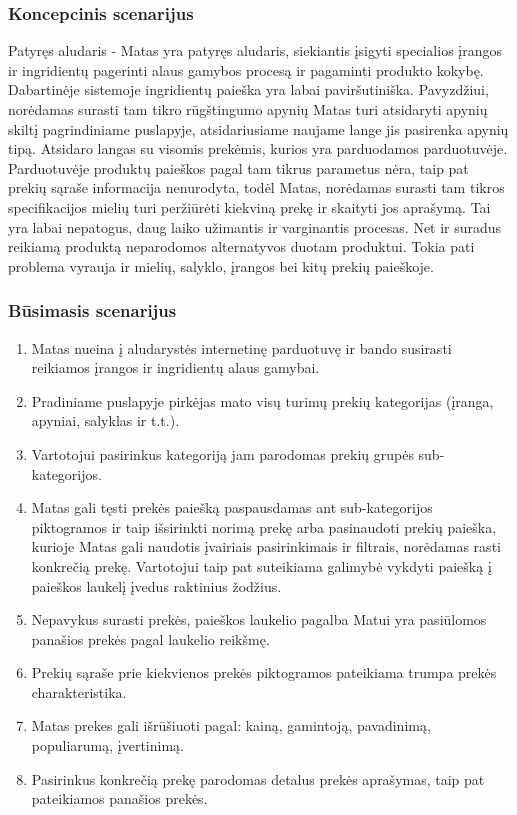 \documentclass[oneside]{VUMIFPSkursinis}
\begin{document}
		\subsubsection{Koncepcinis scenarijus}
			Patyręs aludaris - Matas yra patyręs aludaris, siekiantis įsigyti specialios įrangos ir ingridientų pagerinti alaus gamybos procesą ir pagaminti produkto kokybę.
			Dabartinėje sistemoje ingridientų paieška yra labai paviršutiniška.
			Pavyzdžiui, norėdamas surasti tam tikro rūgštingumo apynių Matas turi atsidaryti apynių skiltį pagrindiniame puslapyje, atsidariusiame naujame lange jis pasirenka apynių tipą.
			Atsidaro langas su visomis prekėmis, kurios yra parduodamos parduotuvėje.
			Parduotuvėje produktų paieškos pagal tam tikrus parametus nėra, taip pat prekių sąraše informacija nenurodyta, todėl Matas, norėdamas surasti tam tikros specifikacijos mielių turi peržiūrėti kiekviną prekę ir skaityti jos aprašymą.
			Tai yra labai nepatogus, daug laiko užimantis ir varginantis procesas.
			Net ir suradus reikiamą produktą neparodomos alternatyvos duotam produktui.
			Tokia pati problema vyrauja ir mielių, salyklo, įrangos bei kitų prekių paieškoje.
		\subsubsection{Būsimasis scenarijus}
			\begin{enumerate}
				\item{Matas nueina į aludarystės internetinę parduotuvę ir bando susirasti reikiamos įrangos ir ingridientų alaus gamybai.}
				\item{Pradiniame puslapyje pirkėjas mato visų turimų prekių kategorijas (įranga, apyniai, salyklas ir t.t.).}
				\item{Vartotojui pasirinkus kategoriją jam parodomas prekių grupės sub-kategorijos.}
				\item{Matas gali tęsti prekės paiešką paspausdamas ant sub-kategorijos piktogramos ir taip išsirinkti norimą prekę arba pasinaudoti prekių paieška, kurioje Matas gali naudotis įvairiais  pasirinkimais ir filtrais, norėdamas rasti konkrečią prekę. Vartotojui taip pat suteikiama galimybė vykdyti paiešką į paieškos laukelį įvedus raktinius žodžius.}
				\item{Nepavykus surasti prekės, paieškos laukelio pagalba Matui yra pasiūlomos panašios prekės pagal laukelio reikšmę.}
				\item{Prekių sąraše prie kiekvienos prekės piktogramos pateikiama trumpa prekės charakteristika. }
				\item{Matas prekes gali išrūšiuoti pagal: kainą, gamintoją, pavadinimą, populiarumą, įvertinimą.}
				\item{Pasirinkus konkrečią prekę parodomas detalus prekės aprašymas, taip pat pateikiamos panašios prekės.}
			\end{enumerate}
\end{document}
